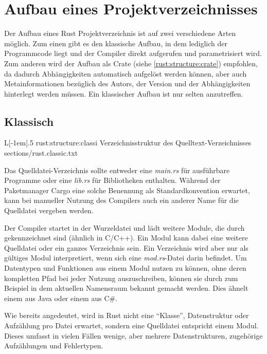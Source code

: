 \clearpage
\section{Aufbau eines Projektverzeichnisses}

Der Aufbau eines Rust Projektverzeichnis ist auf zwei verschiedene Arten möglich.
Zum einen gibt es den klassische Aufbau, in dem lediglich der Programmcode liegt und der Compiler direkt aufgerufen und parametrisiert wird.
Zum anderen wird der Aufbau als Crate (siehe \autoref{rust:structure:crate}) empfohlen, da dadurch Abhängigkeiten automatisch aufgelöst werden können, aber auch Metainformationen bezüglich des Autors, der Version und der Abhängigkeiten hinterlegt werden müssen.
Ein klassischer Aufbau ist nur selten anzutreffen.


\subsection{Klassisch}
\label{rust:structure:classic}
\begin{wrapfigure}{L}[-1em]{.5\textwidth}
	\rustcinclude
		{rust:structure:classi}
		{Verzeichnisstruktur des Quelltext-Verzeichnisses}
		{sections/rust.classic.txt}
\end{wrapfigure}

Das Quelldatei-Verzeichnis sollte entweder eine \textit{main.rs} für ausführbare Programme oder eine \textit{lib.rs} für Bibliotheken enthalten.
Während der Paketmanager Cargo eine solche Benennung als Standardkonvention erwartet, kann bei manueller Nutzung des Compilers auch ein anderer Name für die Quelldatei vergeben werden.

Der Compiler startet in der Wurzeldatei und lädt weitere Module, die durch  gekennzeichnet sind (ähnlich  in C/C++).
Ein Modul kann dabei eine weitere Quelldatei oder ein ganzes Verzeichnis sein.
Ein Verzeichnis wird aber nur als gültiges Modul interpretiert, wenn sich eine \textit{mod.rs}-Datei darin befindet.
Um Datentypen und Funktionen aus einem Modul nutzen zu können, ohne deren kompletten Pfad bei jeder Nutzung auszuschreiben, können sie durch zum Beispiel  in dem aktuellen Namensraum bekannt gemacht werden.
Dies ähnelt einem  aus Java oder einem  aus C\#.

Wie bereits angedeutet, wird in Rust nicht eine \enquote{Klasse}, Datenstruktur oder Aufzählung pro Datei erwartet, sondern eine Quelldatei entspricht einem Modul.
Dieses umfasst in vielen Fällen wenige, aber mehrere Datenstrukturen, zugehörige Aufzählungen und Fehlertypen.

